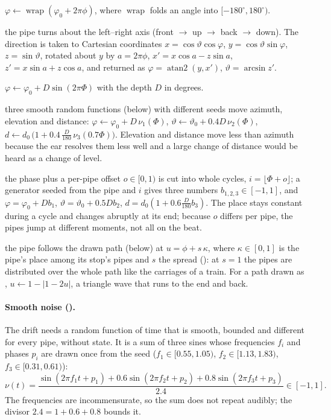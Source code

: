 \begin{description}[style=nextline]
  \item[Rotation] $\varphi \leftarrow \operatorname{wrap}(\varphi_0 + 2\pi\phi)$, where
    $\operatorname{wrap}$ folds an angle into $[-180^\circ,180^\circ)$.
  \item[Vertical] the pipe turns about the left--right axis (front $\to$ up $\to$ back $\to$ down). The direction is
    taken to Cartesian coordinates $x = \cos\vartheta\cos\varphi$, $y = \cos\vartheta\sin\varphi$, $z = \sin\vartheta$,
    rotated about $y$ by $a = 2\pi\phi$,
    $x' = x\cos a - z\sin a$, $z' = x\sin a + z\cos a$, and returned as $\varphi = \operatorname{atan2}(y,x')$,
    $\vartheta = \arcsin z'$.
  \item[Pendel] $\varphi \leftarrow \varphi_0 + D\sin(2\pi\Phi)$ with the depth $D$ in degrees.
  \item[Drift] three smooth random functions (below) with different seeds move azimuth, elevation and distance:
    $\varphi \leftarrow \varphi_0 + D\,\nu_1(\Phi)$, $\vartheta \leftarrow \vartheta_0 + 0.4D\,\nu_2(\Phi)$,
    $d \leftarrow d_0\,\bigl(1 + 0.4\,\tfrac{D}{180}\,\nu_3(0.7\Phi)\bigr)$. Elevation and distance move less than
    azimuth because the ear resolves them less well and a large change of distance would be heard as a change of
    level.
  \item[Sprünge] the phase plus a per-pipe offset $o\in[0,1)$ is cut into whole cycles, $i = \lfloor\Phi+o\rfloor$; a
    generator seeded from the pipe and $i$ gives three numbers $b_{1,2,3}\in[-1,1]$, and
    $\varphi = \varphi_0 + Db_1$, $\vartheta = \vartheta_0 + 0.5Db_2$, $d = d_0(1+0.6\tfrac{D}{180}b_3)$. The place
    stays constant during a cycle and changes abruptly at its end; because $o$ differs per pipe, the pipes jump at
    different moments, not all on the beat.
  \item[Gezeichnet] the pipe follows the drawn path (below) at $u = \phi + s\,\kappa$, where $\kappa\in[0,1]$ is the
    pipe's place among its stop's pipes and $s$ the spread (): at $s=1$ the pipes are distributed over
    the whole path like the carriages of a train. For a path drawn as ,
    $u \leftarrow 1 - |1-2u|$, a triangle wave that runs to the end and back.
\end{description}

\paragraph{Smooth noise ().} The drift needs a random function of time that is smooth, bounded and
different for every pipe, without state. It is a sum of three sines whose frequencies $f_i$ and phases $p_i$ are
drawn once from the seed ($f_1\in[0.55,1.05)$, $f_2\in[1.13,1.83)$, $f_3\in[0.31,0.61)$):
\begin{equation}
  \nu(t) = \frac{\sin(2\pi f_1 t+p_1) + 0.6\sin(2\pi f_2 t+p_2) + 0.8\sin(2\pi f_3 t+p_3)}{2.4}\in[-1,1].
\end{equation}
The frequencies are incommensurate, so the sum does not repeat audibly; the divisor $2.4 = 1+0.6+0.8$ bounds it.


